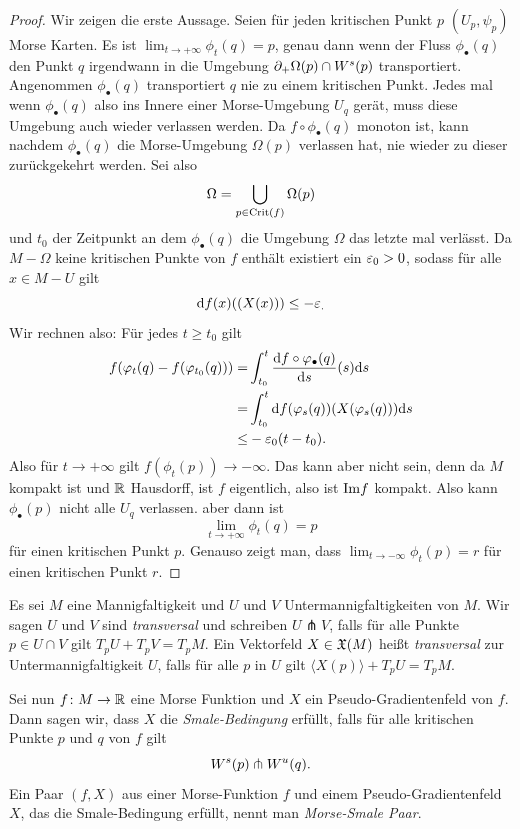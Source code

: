 \begin{proof}
    Wir zeigen die erste Aussage. Seien für jeden kritischen Punkt $p$ $(U_p, \psi_p)$ Morse Karten.
    Es ist $\lim_{t \to + \infty} \phi_t(q) = p$, genau dann wenn
    der Fluss $\phi_{\bullet}(q)$ den Punkt $q$ irgendwann in die Umgebung 
    ${ \partial }_+ \Omega (p) \cap { W^s }(p)$ transportiert. Angenommen $\phi_{\bullet}(q)$ transportiert
    $q$ nie zu einem kritischen Punkt. Jedes mal wenn $\phi_{\bullet}(q)$ also ins Innere einer
    Morse-Umgebung $U_q$ gerät, muss diese Umgebung auch wieder verlassen werden. Da 
    $f \circ \phi_{\bullet}(q)$ monoton ist, kann nachdem $\phi_{\bullet}(q)$ die Morse-Umgebung 
    $\Omega (p)$ verlassen hat, nie wieder zu dieser zurückgekehrt werden.
    Sei also 
    \[ \Omega = \bigcup_{p \in { \operatorname{Crit} }(f)} \Omega (p) \]
    und $t_0$ der Zeitpunkt an dem $\phi_{\bullet} (q)$ die Umgebung $\Omega$ das letzte mal verlässt.
    Da $M - \Omega$ keine kritischen Punkte von $f$ enthält existiert ein $\varepsilon_0 > 0$, sodass für 
    alle $x \in M - U$ gilt 
    \[ { \operatorname{d} } f (x) ((X(x))) \leq - \varepsilon_ . \]
    Wir rechnen also: Für jedes $t \geq t_0$ gilt
    \begin{align*}
        f(\varphi_t(q) - f(\varphi_{t_0}(q))) = & 
            \int_{t_0}^t \derive[f \circ \phi_{\bullet}(q)]{s} (s) \opd s \\
        = & \int_{t_0}^t \opd f (\phi_s(q)) (X(\phi_s(q))) \opd s \\
        \leq & - \eps_0 (t - t_0) . 
    \end{align*}
    Also für $t \to + \infty$ gilt $f(\phi_t(p)) \to - \infty$. Das kann aber nicht sein, denn da 
    $M$ kompakt ist und ${ \mathbb R }$ Hausdorff, ist $f$ eigentlich, also ist ${ \operatorname{Im} } f$ kompakt. 
     Also kann $\phi_{\bullet}(p)$ 
    nicht alle $U_q$ verlassen. aber dann ist 
    \[ \lim_{t \to + \infty} \phi_t(q) = p \]
    für einen kritischen Punkt $p$.
    Genauso zeigt man, dass $\lim_{t \to - \infty} \phi_t(p) = r$ für einen kritischen Punkt $r$.
\end{proof}

\begin{definition}
    \label{def: smale-bedingung}
    Es sei $M$ eine Mannigfaltigkeit und $U$ und $V$ Untermannigfaltigkeiten von $M$. Wir sagen 
    $U$ und $V$ sind \textit{transversal} und schreiben $U \pitchfork V$, falls für alle Punkte 
    $p \in U \cap V$ gilt $T_pU + T_pV = T_pM$. Ein Vektorfeld $X \in { \mathfrak{X} } (M)$ heißt 
    \textit{transversal} zur Untermannigfaltigkeit $U$, falls für alle $p$ in $U$ gilt 
    $\langle X(p) \rangle + T_pU = T_pM$.

    Sei nun $f \colon M \to { \mathbb R }$ eine Morse Funktion und $X$ ein Pseudo-Gradientenfeld von $f$. Dann 
    sagen wir, dass $X$ die \textit{Smale-Bedingung} erfüllt, falls für alle kritischen Punkte 
    $p$ und $q$ von $f$ gilt 
    \[ { W^s } (p) \pitchfork { W^u } (q) . \]
    Ein Paar $(f, X)$ aus einer Morse-Funktion $f$ und einem Pseudo-Gradientenfeld $X$, das die 
    Smale-Bedingung erfüllt, nennt man \textit{Morse-Smale Paar}.
\end{definition}

